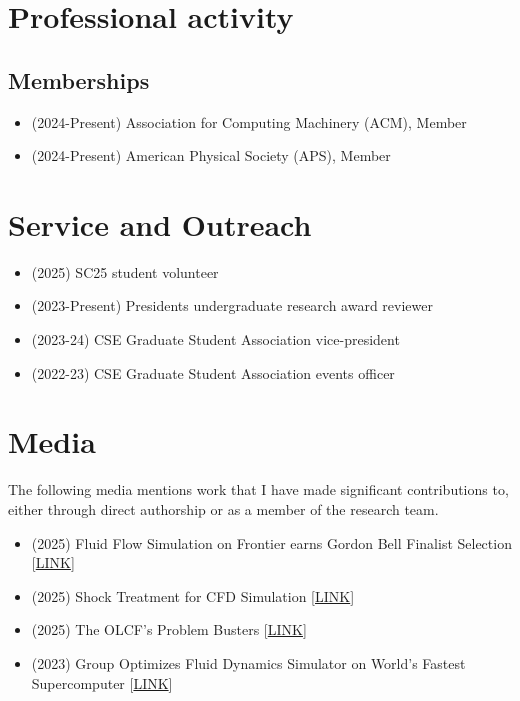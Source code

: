 \documentclass{article}
\begin{document}
\section{Professional activity}

\subsection{Memberships}
\begin{itemize}
    \item[\faChevronRight] (2024-Present) Association for Computing Machinery (ACM), Member
    \item[\faChevronRight] (2024-Present) American Physical Society (APS), Member
\end{itemize}

\section{Service and Outreach}
\begin{itemize}
    \item[\faChevronRight] (2025) SC25 student volunteer
    \item[\faChevronRight] (2023-Present) Presidents undergraduate research award reviewer
    \item[\faChevronRight] (2023-24) CSE Graduate Student Association vice-president
    \item[\faChevronRight] (2022-23) CSE Graduate Student Association events officer
\end{itemize}

\section{Media}
The following media mentions work that I have made significant contributions to, either through direct authorship or as a member of the research team.
\begin{itemize}
    \item[\faNewspaper] (2025) Fluid Flow Simulation on Frontier earns Gordon Bell Finalist Selection [\href{https://www.ornl.gov/news/fluid-flow-simulation-frontier-earns-gordon-bell-finalist-selection}{LINK}]
    \item[\faNewspaper] (2025) Shock Treatment for CFD Simulation [\href{https://www.olcf.ornl.gov/2025/07/23/shock-treatment-for-cfd-simulations/}{LINK}]
    \item[\faNewspaper] (2025) The OLCF's Problem Busters [\href{https://www.olcf.ornl.gov/2025/02/11/the-olcfs-problem-busters/}{LINK}]
    \item[\faNewspaper] (2023) Group Optimizes Fluid Dynamics Simulator on World’s Fastest Supercomputer [\href{https://www.cc.gatech.edu/news/group-optimizes-fluid-dynamics-simulator-worlds-fastest-supercomputer}{LINK}]
\end{itemize}
\end{document}
